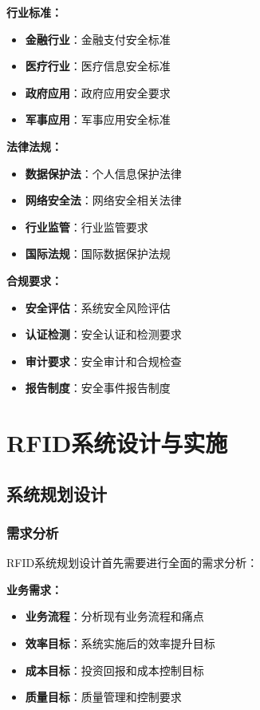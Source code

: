 \documentclass[12pt,UTF8]{ctexbook}
\begin{document}
\begin{itemize}[leftmargin=3.5em]
\begin{itemize}[leftmargin=3.5em]
\begin{itemize}[leftmargin=3.5em]
\begin{itemize}[leftmargin=3.5em]
\textbf{行业标准：}
\begin{itemize}[leftmargin=3.5em]
    \item \textbf{金融行业}：金融支付安全标准
    \item \textbf{医疗行业}：医疗信息安全标准
    \item \textbf{政府应用}：政府应用安全要求
    \item \textbf{军事应用}：军事应用安全标准
\end{itemize}

\textbf{法律法规：}
\begin{itemize}[leftmargin=3.5em]
    \item \textbf{数据保护法}：个人信息保护法律
    \item \textbf{网络安全法}：网络安全相关法律
    \item \textbf{行业监管}：行业监管要求
    \item \textbf{国际法规}：国际数据保护法规
\end{itemize}

\textbf{合规要求：}
\begin{itemize}[leftmargin=3.5em]
    \item \textbf{安全评估}：系统安全风险评估
    \item \textbf{认证检测}：安全认证和检测要求
    \item \textbf{审计要求}：安全审计和合规检查
    \item \textbf{报告制度}：安全事件报告制度
\end{itemize}

\part{RFID系统设计与实施}

\chapter{系统规划设计}

\section{需求分析}

RFID系统规划设计首先需要进行全面的需求分析：

\textbf{业务需求：}
\begin{itemize}[leftmargin=3.5em]
    \item \textbf{业务流程}：分析现有业务流程和痛点
    \item \textbf{效率目标}：系统实施后的效率提升目标
    \item \textbf{成本目标}：投资回报和成本控制目标
    \item \textbf{质量目标}：质量管理和控制要求
\end{itemize}


\end{itemize}
\end{itemize}
\end{itemize}
\end{itemize}
\end{document}
